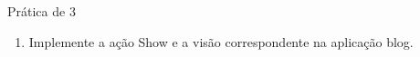 \begin{frame}{Prática de 3}
	\begin{enumerate}
        \item Implemente a ação Show e a visão correspondente na aplicação 
        blog.
	\end{enumerate}
\end{frame}